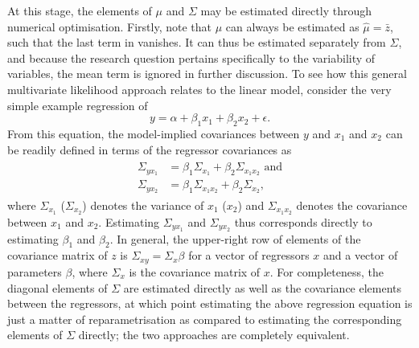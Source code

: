 At this stage, the elements of $\mu$ and $\Sigma$ may be estimated directly through numerical optimisation.
Firstly, note that $\mu$ can always be estimated as $\hat{\mu} = \bar{z}$, such that the last term in
 vanishes. It can thus be estimated separately from $\Sigma$,
and because the research question pertains specifically to the variability of variables,
the mean term is ignored in further discussion.
To see how this general multivariate likelihood approach relates to the linear model, consider the very simple example
regression of
\begin{equation}
    \label{eq:methods:simple_regression}
    y = \alpha + \beta_1 x_1 + \beta_2 x_2 + \epsilon.
\end{equation}
From this equation, the model-implied covariances between $y$
and $x_1$ and $x_2$ can be readily defined in terms of the regressor covariances as
\begin{align}
\begin{split}
    \label{eq:methods:covariance_simple_regression}
    \Sigma_{y x_1} &= \beta_1 \Sigma_{x_1} + \beta_2 \Sigma_{x_1 x_2}\text{ and} \\
    \Sigma_{y x_2} &= \beta_1 \Sigma_{x_1 x_2} + \beta_2 \Sigma_{x_2},
\end{split}
\end{align}
where $\Sigma_{x_1}$ ($\Sigma_{x_2}$) denotes the variance of $x_1$ ($x_2$) and $\Sigma_{x_1 x_2}$ denotes the covariance between $x_1$ and $x_2$.
Estimating $\Sigma_{y x_1}$ and $\Sigma_{y x_2}$ thus corresponds directly to estimating $\beta_1$ and $\beta_2$.
In general, the upper-right row of elements of the covariance matrix of $z$ is $\Sigma_{xy} = \Sigma_x \beta$ for
a vector of regressors $x$ and a vector of parameters $\beta$, where $\Sigma_x$ is the covariance matrix of $x$.
For completeness, the diagonal elements of $\Sigma$ are estimated directly as well as the covariance elements between
the regressors, at which point estimating the above regression equation is just a matter of reparametrisation as compared
to estimating the corresponding elements of $\Sigma$ directly; the two approaches are completely equivalent.

